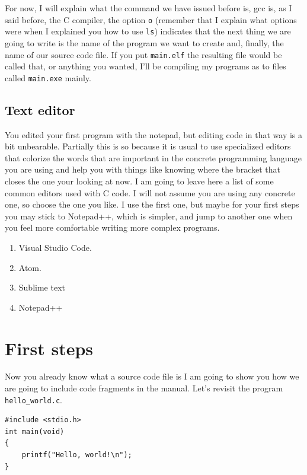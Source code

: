 \documentclass[a4paper]{article}
\begin{document}
For now, I will explain what the command we have issued before is, gcc is, as
I said before, the C compiler, the option \verb!o! (remember that I explain
what options were when I explained you how to use \verb!ls!) indicates that the
next thing we are going to write is the name of the program we want to create
and, finally, the name of our source code file. If you put \verb!main.elf! the
resulting file would be called that, or anything you wanted, I'll be compiling
my programs as to files called \verb!main.exe! mainly.

\subsection{Text editor}
You edited your first program with the notepad, but editing code in that way
is a bit unbearable. Partially this is so because it is usual to use specialized
editors that colorize the words that are important in the concrete programming
language you are using and help you with things like knowing where the bracket
that closes the one your looking at now. I am going to leave here a list of
some common editors used with C code. I will not assume you are using any
concrete one, so choose the one you like. I use the first one, but maybe for
your first steps you may stick to Notepad++, which is simpler, and jump
to another one when you feel more comfortable writing more complex programs.
\begin{enumerate}
    \item Visual Studio Code.
    \item Atom.
    \item Sublime text
    \item Notepad++
\end{enumerate}

\section{First steps}

Now you already know what a source code file is I am going to show you how we
are going to include code fragments in the manual. Let's revisit the program
\verb!hello_world.c!.

\noindent
\begin{minipage}[H]{\linewidth}
\mbox{}
\begin{lstlisting}[style=C, caption={Hello World in C},
label={lst:helloWorld}]
#include <stdio.h>
int main(void)
{
    printf("Hello, world!\n");
}
\end{lstlisting}
\end{minipage}
\end{document}
